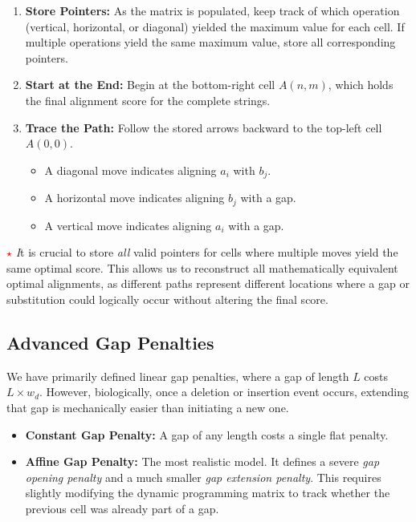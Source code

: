 \documentclass[11pt,a4paper]{article}
\newcommand{\sta}{\textcolor{red}{\textbf{\large $\star$}} \textit}
\begin{document}
\begin{enumerate}
    \item \textbf{Store Pointers:} As the matrix is populated, keep track of which operation (vertical, horizontal, or diagonal) yielded the maximum value for each cell. If multiple operations yield the same maximum value, store all corresponding pointers.
    \item \textbf{Start at the End:} Begin at the bottom-right cell \( A(n, m) \), which holds the final alignment score for the complete strings.
    \item \textbf{Trace the Path:} Follow the stored arrows backward to the top-left cell \( A(0,0) \). 
    \begin{itemize}
        \item A diagonal move indicates aligning \( a_i \) with \( b_j \).
        \item A horizontal move indicates aligning \( b_j \) with a gap.
        \item A vertical move indicates aligning \( a_i \) with a gap.
    \end{itemize}
\end{enumerate}

\sta It is crucial to store \textit{all} valid pointers for cells where multiple moves yield the same optimal score. This allows us to reconstruct all mathematically equivalent optimal alignments, as different paths represent different locations where a gap or substitution could logically occur without altering the final score. 

\subsection{Advanced Gap Penalties}
We have primarily defined linear gap penalties, where a gap of length \( L \) costs \( L \times w_d \). However, biologically, once a deletion or insertion event occurs, extending that gap is mechanically easier than initiating a new one.
\begin{itemize}
    \item \textbf{Constant Gap Penalty:} A gap of any length costs a single flat penalty.
    \item \textbf{Affine Gap Penalty:} The most realistic model. It defines a severe \textit{gap opening penalty} and a much smaller \textit{gap extension penalty}. This requires slightly modifying the dynamic programming matrix to track whether the previous cell was already part of a gap.
\end{itemize}
\end{document}
